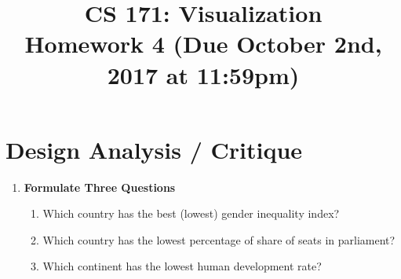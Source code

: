 \documentclass[11pt]{article}
\begin{document}
\title{
  CS 171: Visualization \\
  \Large{Homework 4 (Due October 2nd, 2017 at 11:59pm)}
}
\date{}

\maketitle

\vspace{-1cm}


\section*{Design Analysis / Critique}

\begin{enumerate}
  \item \textbf{Formulate Three Questions}
  \begin{enumerate}
    \item Which country has the best (lowest) gender inequality index?
    \item Which country has the lowest percentage of share of seats in parliament?
    \item Which continent has the lowest human development rate?
  \end{enumerate}
  

\end{enumerate}
\end{document}
